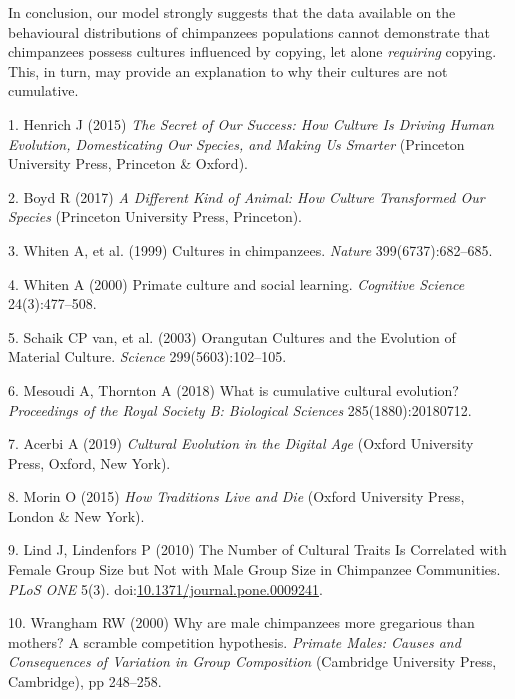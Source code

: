 \documentclass[9pt,twocolumn,twoside,]{pnas-new}
\begin{document}
In conclusion, our model strongly suggests that the data available on
the behavioural distributions of chimpanzees populations cannot
demonstrate that chimpanzees possess cultures influenced by copying, let
alone \emph{requiring} copying. This, in turn, may provide an
explanation to why their cultures are not cumulative.

\showmatmethods
\showacknow
\pnasbreak

\hypertarget{refs}{}
\hypertarget{ref-henrich_secret_2015}{}
1. Henrich J (2015) \emph{The Secret of Our Success: How Culture Is
Driving Human Evolution, Domesticating Our Species, and Making Us
Smarter} (Princeton University Press, Princeton \& Oxford).

\hypertarget{ref-boyd_different_2017}{}
2. Boyd R (2017) \emph{A Different Kind of Animal: How Culture
Transformed Our Species} (Princeton University Press, Princeton).

\hypertarget{ref-whiten_cultures_1999}{}
3. Whiten A, et al. (1999) Cultures in chimpanzees. \emph{Nature}
399(6737):682--685.

\hypertarget{ref-whiten_primate_2000}{}
4. Whiten A (2000) Primate culture and social learning. \emph{Cognitive
Science} 24(3):477--508.

\hypertarget{ref-van_schaik_orangutan_2003}{}
5. Schaik CP van, et al. (2003) Orangutan Cultures and the Evolution of
Material Culture. \emph{Science} 299(5603):102--105.

\hypertarget{ref-mesoudi_what_2018}{}
6. Mesoudi A, Thornton A (2018) What is cumulative cultural evolution?
\emph{Proceedings of the Royal Society B: Biological Sciences}
285(1880):20180712.

\hypertarget{ref-acerbi_cultural_2019}{}
7. Acerbi A (2019) \emph{Cultural Evolution in the Digital Age} (Oxford
University Press, Oxford, New York).

\hypertarget{ref-morin_how_2015}{}
8. Morin O (2015) \emph{How Traditions Live and Die} (Oxford University
Press, London \& New York).

\hypertarget{ref-lind_number_2010}{}
9. Lind J, Lindenfors P (2010) The Number of Cultural Traits Is
Correlated with Female Group Size but Not with Male Group Size in
Chimpanzee Communities. \emph{PLoS ONE} 5(3).
doi:\href{https://doi.org/10.1371/journal.pone.0009241}{10.1371/journal.pone.0009241}.

\hypertarget{ref-wrangham_why_2000}{}
10. Wrangham RW (2000) Why are male chimpanzees more gregarious than
mothers? A scramble competition hypothesis. \emph{Primate Males: Causes
and Consequences of Variation in Group Composition} (Cambridge
University Press, Cambridge), pp 248--258.
\end{document}
